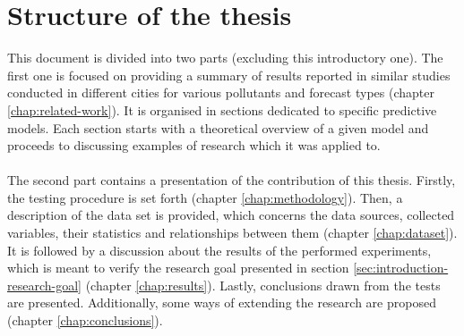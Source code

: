 \section{Structure of the thesis}
This document is divided into two parts (excluding this introductory one). The first one  is focused on providing a summary of results reported in similar studies conducted in different cities for various pollutants and forecast types (chapter \ref{chap:related-work}). It is organised in sections dedicated to specific predictive models. Each section starts with a theoretical overview of a given model and proceeds to discussing examples of research which it was applied to.
\\\\
The second part contains a presentation of the contribution of this thesis. Firstly, the testing procedure is set forth (chapter \ref{chap:methodology}). Then, a description of the data set is provided, which concerns the data sources, collected variables, their statistics and relationships between them (chapter \ref{chap:dataset}). It is followed by a discussion about the results of the performed experiments, which is meant to verify the research goal presented in section \ref{sec:introduction-research-goal} (chapter \ref{chap:results}). Lastly, conclusions drawn from the tests are presented. Additionally, some ways of extending the research are proposed (chapter \ref{chap:conclusions}).
